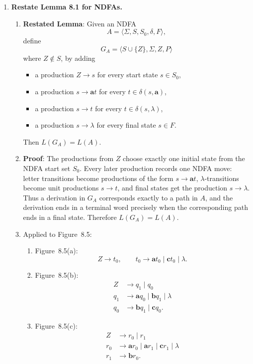 \begin{enumerate}[{8.}1. ]
\item \textbf{Restate Lemma 8.1 for NDFAs.}

\begin{enumerate}
\item \textbf{Restated Lemma}: Given an NDFA
\[
A=\langle\Sigma,S,S_0,\delta,F\rangle,
\]
define
\[
G_A=\langle S\cup\{Z\},\Sigma,Z,P\rangle
\]
where $Z\notin S$, by adding
\begin{itemize}
\item a production $Z\to s$ for every start state $s\in S_0$,
\item a production $s\to \pmb{a}t$ for every $t\in\delta(s,\pmb{a})$,
\item a production $s\to t$ for every $t\in\delta(s,\lambda)$,
\item a production $s\to\lambda$ for every final state $s\in F$.
\end{itemize}
Then $L(G_A)=L(A)$.

\item \textbf{Proof}: The productions from $Z$ choose exactly one initial state
from the NDFA start set $S_0$.  Every later production records one NDFA move:
letter transitions
become productions of the form $s\to \pmb{a}t$, $\lambda$-transitions become unit
productions $s\to t$, and final states get the production $s\to\lambda$.  Thus a
derivation in $G_A$ corresponds exactly to a path in $A$, and the derivation
ends in a terminal word precisely when the corresponding path ends in a final
state.  Therefore $L(G_A)=L(A)$.

\item Applied to Figure~8.5:
\begin{enumerate}
\item Figure~8.5(a):
\[
Z\to t_0,\qquad
t_0\to \pmb{a}t_0\mid \pmb{c}t_0\mid \lambda.
\]

\item Figure~8.5(b):
\[
\begin{aligned}
Z&\to q_1\mid q_0\\
q_1&\to \pmb{a}q_0\mid \pmb{b}q_1\mid \lambda\\
q_0&\to \pmb{b}q_1\mid \pmb{c}q_0.
\end{aligned}
\]

\item Figure~8.5(c):
\[
\begin{aligned}
Z&\to r_0\mid r_1\\
r_0&\to \pmb{a}r_0\mid \pmb{a}r_1\mid \pmb{c}r_1\mid \lambda\\
r_1&\to \pmb{b}r_0.
\end{aligned}
\]


\end{enumerate}
\end{enumerate}
\end{enumerate}

